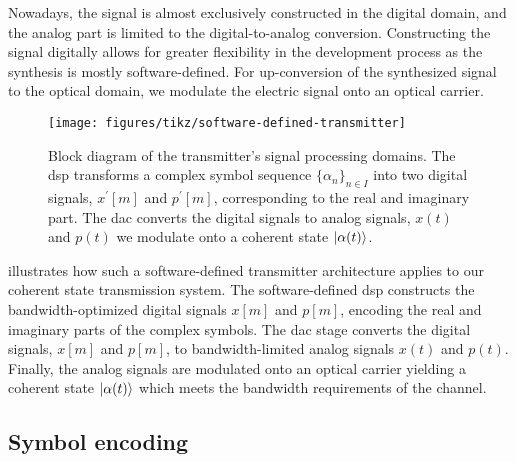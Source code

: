 Nowadays, the signal is almost exclusively constructed in the digital domain, and the analog part is limited to the digital-to-analog conversion.
Constructing the signal digitally allows for greater flexibility in the development process as the synthesis is mostly software-defined.
For up-conversion of the synthesized signal to the optical domain, we modulate the electric signal onto an optical carrier.
\begin{figure}[htb]
	\centering
	\texttt{[image: figures/tikz/software-defined-transmitter]}
	\caption{Block diagram of the transmitter's signal processing domains. The \gls{dsp} transforms a complex symbol sequence $\{\alpha_n\}_{n\in I}$ into two digital signals, $x^\prime[m]$ and $p^\prime[m]$, corresponding to the real and imaginary part. The \gls{dac} converts the digital signals to analog signals, $x(t)$ and $p(t)$ we modulate onto a coherent state $\lvert\alpha(t)\rangle$.}\label{fig:software_defined_transmitter}
\end{figure}
 illustrates how such a software-defined transmitter architecture applies to our coherent state transmission system.
The software-defined \gls{dsp} constructs the bandwidth-optimized digital signals $x[m]$ and $p[m]$, encoding the real and imaginary parts of the complex symbols.
The \gls{dac} stage converts the digital signals, $x[m]$ and $p[m]$, to bandwidth-limited analog signals $x(t)$ and $p(t)$.
Finally, the analog signals are modulated onto an optical carrier yielding a coherent state $\lvert\alpha(t)\rangle$ which meets the bandwidth requirements of the channel.

\subsection{Symbol encoding}

